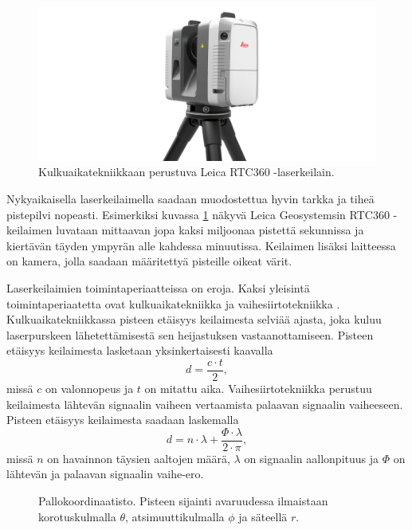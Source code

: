 \begin{figure}
    \centering
    \includegraphics[width=0.7\paperwidth]{img/leica.jpg}
    \caption{Kulkuaikatekniikkaan perustuva Leica RTC360 -laserkeilain. \cite{skannerikuva}}
    \label{leica}
\end{figure}

Nykyaikaisella laserkeilaimella saadaan muodostettua hyvin tarkka ja tiheä pistepilvi nopeasti. Esimerkiksi kuvassa \ref{leica} näkyvä Leica Geosystemsin RTC360 -keilaimen luvataan mittaavan jopa kaksi miljoonaa pistettä sekunnissa ja kiertävän täyden ympyrän alle kahdessa minuutissa. Keilaimen lisäksi laitteessa on kamera, jolla saadaan määritettyä pisteille oikeat värit. \cite{leica} 

Laserkeilaimien toimintaperiaatteissa on eroja. Kaksi yleisintä toimintaperiaatetta ovat kulkuaikatekniikka  ja vaihesiirtotekniikka . Kulkuaikatekniikkassa pisteen etäisyys keilaimesta selviää ajasta, joka kuluu laserpurskeen lähetettämisestä sen heijastuksen vastaanottamiseen. Pisteen etäisyys keilaimesta lasketaan yksinkertaisesti kaavalla 
\begin{equation}
    d=\frac{c\cdot t}{2},    
\end{equation}
missä $c$ on valonnopeus ja $t$ on mitattu aika. 
Vaihesiirtotekniikka perustuu keilaimesta lähtevän signaalin vaiheen vertaamista palaavan signaalin vaiheeseen. Pisteen etäisyys keilaimesta saadaan laskemalla 
\begin{equation}
    d=n\cdot \lambda + \frac{\Phi \cdot \lambda}{2 \cdot \pi},
\end{equation}
missä $n$ on havainnon täysien aaltojen määrä, $\lambda$ on signaalin aallonpituus ja $\Phi$ on lähtevän ja palaavan signaalin vaihe-ero. \cite{fabritius}

\begin{figure}
    \centering
    
    \caption{Pallokoordinaatisto. Pisteen sijainti avaruudessa ilmaistaan korotuskulmalla $\theta$, atsimuuttikulmalla $\phi$ ja säteellä $r$.}
    \label{pallo}
\end{figure}{}

